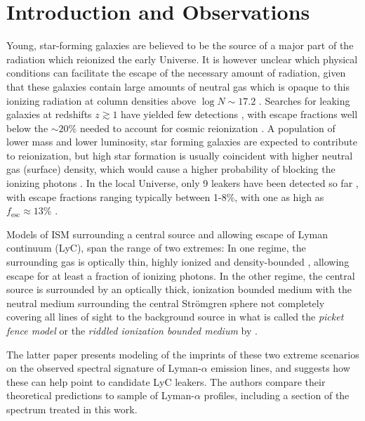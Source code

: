 \documentclass[twocolumn,]{aastex61}
\begin{document}
\section{Introduction and
Observations}\label{introduction-and-observations}

Young, star-forming galaxies are believed to be the source of a major part of
the radiation which reionized the early Universe. It is however unclear which
physical conditions can facilitate the escape of the necessary amount of
radiation, given that these galaxies contain large amounts of neutral gas which
is opaque to this ionizing radiation at column densities above $\log N \sim
17.2$ \citep{Verhamme2015}.  Searches for leaking galaxies at redshifts $z
\gtrsim 1$ have yielded few detections \citep[e.g.][]{Iwata2009, Vanzella2010,
Vanzella2012, Nestor2013, Cowie2009, Siana2010}, with escape fractions
well below the $\sim 20\%$ needed to account for cosmic reionization
\citep{Bouwens2011, Robertson2013}. A population of lower mass and lower
luminosity, star forming galaxies are expected to contribute to reionization,
but high star formation is usually coincident with higher neutral gas
(surface) density, which would cause a higher probability of blocking
the ionizing photons \citep[e.g.][]{Erb2016, Robertson2013}. In the local
Universe, only 9 leakers have been detected so far \citep{Bergvall2006,
Leitet2011, Leitet2013, Borthakur2014, Izotov2016Nat, Izotov2016MNRAS,
Leitherer2016}, with escape fractions ranging typically between 1-8\%,
with one as high as $f_{\mathrm{esc}} \approx 13\%$ \citep{Izotov2016MNRAS}.

Models of ISM surrounding a central source and allowing escape of Lyman
continuum (LyC), span the range of two extremes: In one regime, the surrounding
gas is optically thin, highly ionized and density-bounded \citep[see
e.g.][]{Jaskot2013}, allowing escape for at least a fraction of
ionizing photons. In the other regime, the central source is surrounded by an
optically thick, ionization bounded medium with the neutral medium surrounding
the central Strömgren sphere not completely covering all lines of sight to the
background source in what is called the \emph{picket fence model}
\citep{Conselice2000, Bergvall2006, Heckman2011, Zackrisson2013} or the
\emph{riddled ionization bounded medium} by \cite{Verhamme2015}.


The latter paper presents modeling of
the imprints of these two extreme scenarios on the observed spectral
signature of Lyman-$\alpha$ emission lines, and suggests
how these can help point to candidate LyC leakers. The authors compare their
theoretical predictions to sample of Lyman-$\alpha$ profiles, including
a section of the spectrum treated in this work.
\end{document}

